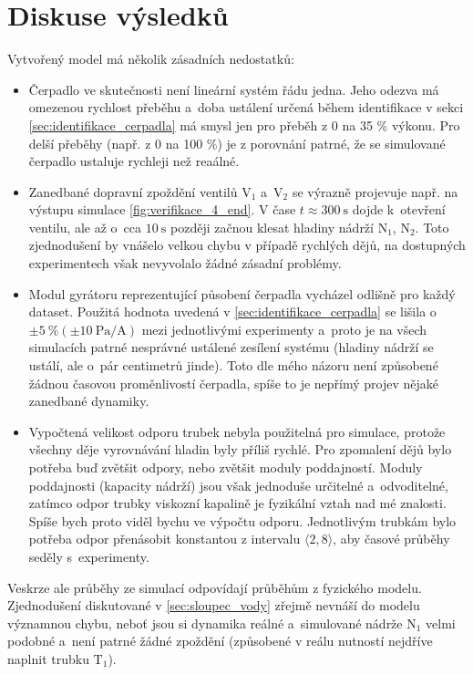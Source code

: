\documentclass[conference]{IEEEtran}
\begin{document}
\section{Diskuse výsledků}
\label{sec:diskuse}

Vytvořený model má několik zásadních nedostatků:
\begin{itemize}
    \item Čerpadlo ve skutečnosti není lineární systém řádu jedna. Jeho odezva má omezenou rychlost přeběhu
    a~doba ustálení určená během identifikace v sekci \ref{sec:identifikace_cerpadla} má smysl jen pro přeběh z 0 na 35 \% výkonu.
    Pro delší přeběhy (např. z 0 na 100 \%) je z porovnání patrné, že se simulované čerpadlo ustaluje rychleji než reaálné.
    \item Zanedbané dopravní zpoždění ventilů $\text{V}_1$ a~$\text{V}_2$ se výrazně projevuje např. na výstupu simulace \ref{fig:verifikace_4_end}.
    V čase $t\approx 300~\si{\second}$ dojde k~otevření ventilu, ale až o~cca $10~\si{\second}$ později začnou klesat hladiny nádrží $\text{N}_1$, $\text{N}_2$.
    Toto zjednodušení by vnášelo velkou chybu v případě rychlých dějů, na dostupných experimentech však nevyvolalo žádné zásadní problémy.
    \item Modul gyrátoru reprezentující působení čerpadla vycházel odlišně pro každý dataset. Použitá hodnota uvedená v \ref{sec:identifikace_cerpadla}
    se lišila o~$\pm 5~\% (\pm 10~\si{\pascal\per\ampere})$ mezi jednotlivými experimenty a~proto je na všech simulacích patrné nesprávné
    ustálené zesílení systému (hladiny nádrží se ustálí, ale o~pár centimetrů jinde). Toto dle mého názoru není způsobené žádnou
    časovou proměnlivostí čerpadla, spíše to je nepřímý projev nějaké zanedbané dynamiky.
    \item Vypočtená velikost odporu trubek nebyla použitelná pro simulace, protože všechny děje vyrovnávání hladin byly příliš rychlé.
    Pro zpomalení dějů bylo potřeba buď zvětšit odpory, nebo zvětšit moduly poddajností. Moduly poddajnosti (kapacity nádrží)
    jsou však jednoduše určitelné a~odvoditelné, zatímco odpor trubky viskozní kapalině je fyzikální vztah nad mé znalosti.
    Spíše bych proto viděl bychu ve výpočtu odporu. Jednotlivým trubkám bylo potřeba odpor přenásobit konstantou z intervalu $\langle 2, 8 \rangle$,
    aby časové průběhy seděly s~experimenty.

\end{itemize}
Veskrze ale průběhy ze simulací odpovídají průběhům z fyzického modelu. Zjednodušení diskutované v \ref{sec:sloupec_vody} zřejmě nevnáší
do modelu významnou chybu, neboť jsou si dynamika reálné a~simulované nádrže $\text{N}_1$ velmi podobné a~není patrné žádné zpoždění
(způsobené v reálu nutností nejdříve naplnit trubku $\text{T}_1$). 
\end{document}
